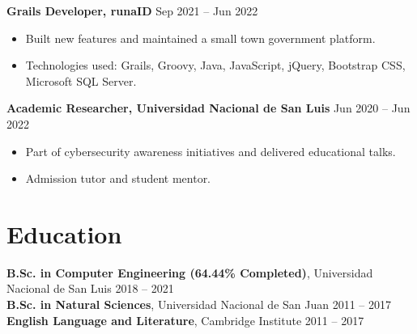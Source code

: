 \documentclass[10pt, letterpaper]{article}
\begin{document}
\textbf{Grails Developer, runaID} \hfill Sep 2021 – Jun 2022 \
\begin{itemize}[leftmargin=10pt, noitemsep]
    \item Built new features and maintained a small town government platform.
    \item Technologies used: Grails, Groovy, Java, JavaScript, jQuery, Bootstrap CSS, Microsoft SQL Server.

\end{itemize}

\textbf{Academic Researcher, Universidad Nacional de San Luis} \hfill Jun 2020 – Jun 2022 \
\begin{itemize}[leftmargin=10pt, noitemsep]
    \item Part of cybersecurity awareness initiatives and delivered educational talks.
    \item Admission tutor and student mentor.
\end{itemize}

\section{Education}
\textbf{B.Sc. in Computer Engineering (64.44\% Completed)}, Universidad Nacional de San Luis \hfill 2018 – 2021 \\
\textbf{B.Sc. in Natural Sciences}, Universidad Nacional de San Juan \hfill 2011 – 2017 \\
\textbf{English Language and Literature}, Cambridge Institute \hfill 2011 – 2017


\end{document}
